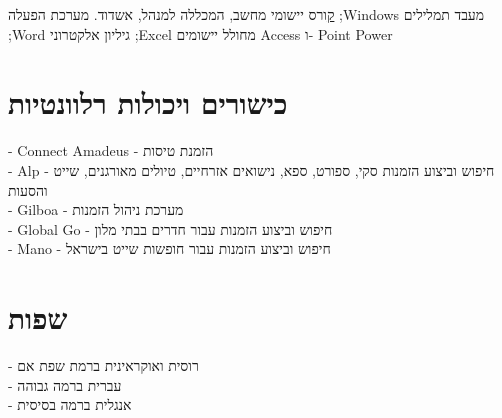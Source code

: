  {
	\href{https://loona-il.000webhostapp.com/resume-references-mom/computer-programs-cert.jpg}
	קורס יישומי מחשב, המכללה למנהל, אשדוד.}
 {מערכת הפעלה ;Windows
 מעבד תמלילים ;Word
 גיליון אלקטרוני ;Excel מחולל יישומים 
 Access ו- Point Power}
{}
{}





\section{כישורים ויכולות רלוונטיות}
{- Connect Amadeus - הזמנת טיסות \\
	- Alp - חיפוש וביצוע הזמנות סקי, ספורט, ספא, נישואים אזרחיים, טיולים מאורגנים,   שייט והסעות
	\\
	- Gilboa - מערכת ניהול הזמנות \\
 	- Global Go - חיפוש וביצוע הזמנות עבור חדרים בבתי מלון \\
	- Mano - חיפוש וביצוע הזמנות עבור חופשות שייט בישראל}{}{}
\section{שפות}
{
- רוסית ואוקראינית ברמת שפת אם \\
- עברית ברמה גבוהה \\
- אנגלית ברמה בסיסית}
{}
{}
\unsetRTL